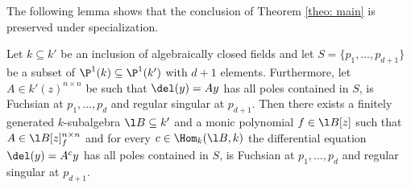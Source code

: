 \documentclass[a4paper, 11pt]{article}
\begin{document}
%
%


The following lemma shows that the conclusion of Theorem \ref{theo: main} is preserved under specialization.


\begin{lemma}\label{lem:regsing}	
	Let $k\subseteq k'$ be an inclusion of algebraically closed fields and let $S=\{p_1,\ldots,p_{d+1}\}$ be a subset of $\P^1(k)\subseteq\P^1(k')$ with $d+1$ elements. Furthermore, let $A \in k'(z)^{n \times n}$ be such that $\del(y)=Ay$ has all poles contained in $S$, is Fuchsian at $p_1,\ldots,p_d$ and regular singular at $p_{d+1}$. Then there exists a finitely generated $k$-subalgebra $\l B \subseteq k'$ and a monic polynomial $f \in \l B[z]$ such that $A \in \l B[z]_f^{n \times n}$ and for every $c \in \Hom_k(\l B, k)$ the differential equation $\del (y) =A^c y$ has all poles contained in $S$, is Fuchsian at $p_1,\ldots,p_d$ and regular singular at $p_{d+1}$.	
\end{lemma}
\end{document}
